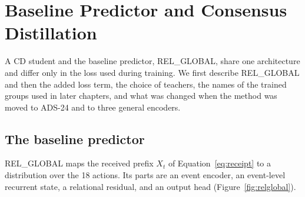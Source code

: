 \chapter{Baseline Predictor and Consensus Distillation}
\label{ch:method}

A CD student and the baseline predictor, REL\_GLOBAL, share one
architecture and differ only in the loss used during training. We
first describe REL\_GLOBAL and then the added loss term, the choice of
teachers, the names of the trained groups used in later chapters, and
what was changed when the method was moved to ADS-24 and to three
general encoders.

\section{The baseline predictor}
\label{sec:method-baseline}

REL\_GLOBAL maps the received prefix $X_t$ of
Equation~\ref{eq:receipt} to a distribution over the 18 actions. Its
parts are an event encoder, an event-level recurrent state, a relational
residual, and an output head (Figure~\ref{fig:relglobal}).



